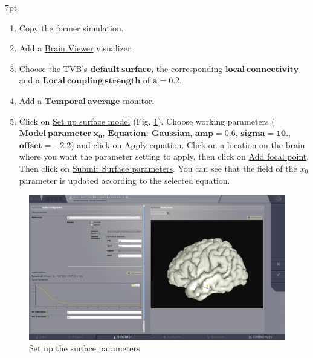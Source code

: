\documentclass{tufte-handout}
\newenvironment{simulation}{%
  \def\FrameCommand{%
    \hspace{1pt}%
    {\color{ForestGreen}\vrule width 2pt}%
    {\color{simulationshade}\vrule width 4pt}%
    \colorbox{simulationshade}%
  }%
  \MakeFramed{\advance\hsize-\width\FrameRestore}%
  \noindent\hspace{-4.55pt}%
  \begin{adjustwidth}{}{7pt}%
  \vspace{2pt}\vspace{2pt}%
}
{%
  \vspace{2pt}\end{adjustwidth}\endMakeFramed%
}
\begin{document}
  \begin{simulation}
  \begin{enumerate}
  \item Copy the former simulation.
  \item Add a \underline{Brain Viewer} visualizer.
  \item Choose the TVB's $\mathbf{default\:surface}$, the corresponding  $\mathbf{local\:connectivity}$ and a $\mathbf{Local\:coupling\:strength}$ of $\mathbf{a=0.2}$.
  \item Add a $\mathbf{Temporal\:average}$ monitor.
  \item Click on \underline{Set up surface model} (Fig. \ref{fig:set_up_surface_parameters}). Choose working parameters
  ($\mathbf{Model\:parameter\:x_0}$, $\mathbf{Equation:\:Gaussian}$, $\mathbf{amp=0.6}$, $\mathbf{sigma=10.}$, $\mathbf{offset=-2.2}$) and 
  click on \underline{Apply equation}.
  Click on a location on the brain where you want the parameter setting to apply, then click on \underline{Add focal point}.
  Then click on \underline{Submit Surface parameters}. You can see that the field of the $x_0$ parameter is updated according to the selected equation.
  \end{enumerate}
\end{simulation}

\begin{figure}[h]
  \includegraphics[width=\linewidth]{Handout_UI_ModellingAnEpilepticPatient_SetUpSurfaceParameters}%
  \caption{Set up the surface parameters}%
  \label{fig:set_up_surface_parameters}%
\end{figure}
\end{document}
